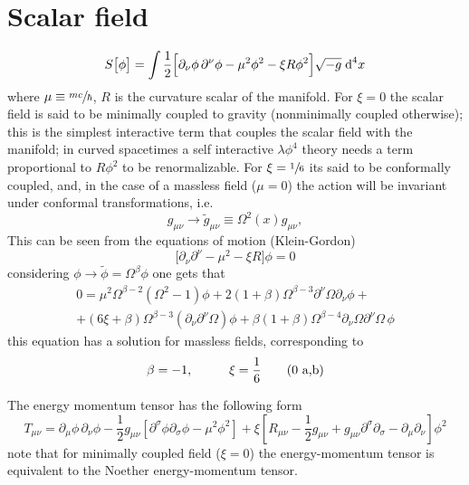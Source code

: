 \section{Scalar field}
\begin{equation}\label{eq: General scalar field action}
	S\big[\phi\big]=\int\frac{1}{2}\Big[\partial_\nu\phi\,\partial^\nu\phi-\mu^2\phi^2-\xi R\phi^2\Big]\sqrt{-g}\;\text{d}^4 x
\end{equation}
where $\mu\equiv\sfrac{m c}{\hbar}$, $R$ is the curvature scalar of the manifold. For $\xi=0$ the scalar field is said to be minimally coupled to gravity (nonminimally coupled otherwise); this is the simplest interactive term that couples the scalar field with the manifold; in curved spacetimes \cite{Bunch_Renorm} a self interactive $\lambda\phi^4$ theory needs a term proportional to $R\phi^2$ to be renormalizable. For $\xi=\sfrac{1}{6}$ its said to be conformally coupled, and, in the case of a massless field ($\mu=0$) the action will be invariant under conformal transformations, i.e.
\begin{equation}
	g_{\mu\nu}\rightarrow \tilde{g}_{\mu\nu}\equiv \Omega^2(x)g_{\mu\nu},
\end{equation}
This can be seen from the equations of motion (Klein-Gordon)
\begin{equation}
	\big[\partial_\nu\partial^\nu-\mu^2-\xi R\big]\phi=0
\end{equation}
considering $\phi\rightarrow\tilde{\phi}=\Omega^\beta\phi$ one gets that
\begin{multline}
	0=\mu^2\Omega^{\beta-2}\left(\Omega^2-1\right)\phi+2\left(1+\beta\right)\Omega^{\beta-3}\partial^\nu\Omega\partial_\nu\phi+\\
	+(6\xi+\beta)\Omega^{\beta-3}\left(\partial_\nu\partial^\nu\Omega\right)\phi+\beta(1+\beta)\Omega^{\beta-4}\partial_\nu\Omega\partial^\nu\Omega\,\phi
\end{multline}
this equation has a solution for massless fields, corresponding to
\begin{subequations}
	\begin{gather}
		\beta=-1,\hspace{1.0cm} \xi=\frac{1}{6}\tag{\theequation \,\,a,b}
	\end{gather}
\end{subequations}

The energy momentum tensor has the following form
\begin{equation}
	T_{\mu\nu}=\partial_\mu\phi\,\partial_\nu\phi -\frac{1}{2}g_{\mu\nu}\left[\partial^\sigma\phi\partial_\sigma\phi-\mu^2\phi^2\right]+\xi\left[R_{\mu\nu}-\frac{1}{2}g_{\mu\nu}+g_{\mu\nu}\partial^\sigma\partial_\sigma-\partial_\mu\partial_\nu\right]\phi^2
\end{equation}
note that for minimally coupled field ($\xi=0$) the energy-momentum tensor is equivalent to the Noether energy-momentum tensor.

